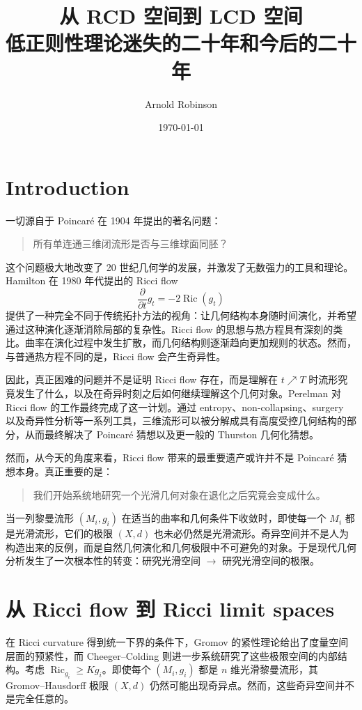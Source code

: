 \documentclass[lualatex]{article}
\title{
    从 RCD 空间到 LCD 空间\\[0.5em]
    \large 低正则性理论迷失的二十年和今后的二十年
}
\author{Arnold Robinson}
\date{\today}
\begin{document}
\maketitle

\section{Introduction}

一切源自于 Poincar\'e 在 1904 年提出的著名问题：

\begin{quote}
所有单连通三维闭流形是否与三维球面同胚？
\end{quote}

这个问题极大地改变了 20 世纪几何学的发展，并激发了无数强力的工具和理论。Hamilton 在 1980 年代提出的 Ricci flow
\[
    \frac{\partial}{\partial t} g_t = -2\operatorname{Ric}(g_t)
\]
提供了一种完全不同于传统拓扑方法的视角：让几何结构本身随时间演化，并希望通过这种演化逐渐消除局部的复杂性。Ricci flow 的思想与热方程具有深刻的类比。曲率在演化过程中发生扩散，而几何结构则逐渐趋向更加规则的状态。然而，与普通热方程不同的是，Ricci flow 会产生奇异性。

因此，真正困难的问题并不是证明 Ricci flow 存在，而是理解在 $t \nearrow T$ 时流形究竟发生了什么，以及在奇异时刻之后如何继续理解这个几何对象。Perelman 对 Ricci flow 的工作最终完成了这一计划。通过 entropy、non-collapsing、surgery 以及奇异性分析等一系列工具，三维流形可以被分解成具有高度受控几何结构的部分，从而最终解决了 Poincar\'e 猜想以及更一般的 Thurston 几何化猜想。

然而，从今天的角度来看，Ricci flow 带来的最重要遗产或许并不是 Poincar\'e 猜想本身。真正重要的是：

\begin{quote}
我们开始系统地研究一个光滑几何对象在退化之后究竟会变成什么。
\end{quote}

当一列黎曼流形 $(M_i,g_i)$ 在适当的曲率和几何条件下收敛时，即使每一个 $M_i$ 都是光滑流形，它们的极限 $(X,d)$ 也未必仍然是光滑流形。奇异空间并不是人为构造出来的反例，而是自然几何演化和几何极限中不可避免的对象。于是现代几何分析发生了一次根本性的转变：研究光滑空间 $\longrightarrow$ 研究光滑空间的极限。

\section{从 Ricci flow 到 Ricci limit spaces}

在 Ricci curvature 得到统一下界的条件下，Gromov 的紧性理论给出了度量空间层面的预紧性，而 Cheeger--Colding 则进一步系统研究了这些极限空间的内部结构。考虑 $\operatorname{Ric}_{g_i} \geq K g_i$。即使每个 $(M_i,g_i)$ 都是 $n$ 维光滑黎曼流形，其 Gromov--Hausdorff 极限 $(X,d)$ 仍然可能出现奇异点。然而，这些奇异空间并不是完全任意的。
\end{document}
